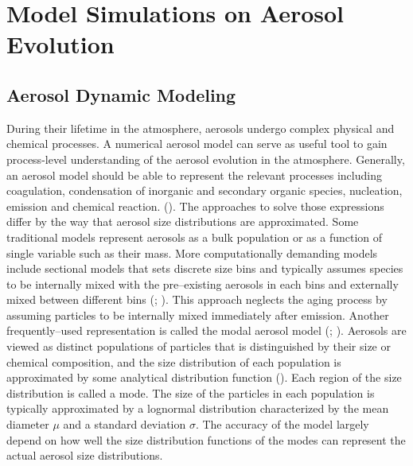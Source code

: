 \documentclass[12pt, fullpage]{uiucthesis2009}
\begin{document}
\newpage

	\section{Model Simulations on Aerosol Evolution}
		\subsection{Aerosol Dynamic Modeling}
		During their lifetime in the atmosphere, aerosols undergo complex physical and chemical processes. A numerical aerosol model can serve as useful tool to gain process-level understanding of the aerosol evolution in the atmosphere. Generally, an aerosol model should be able to represent the relevant processes including coagulation, condensation of inorganic and secondary organic species, nucleation, emission and chemical reaction. (\cite{whitby1997}). The approaches to solve those expressions differ by the way that aerosol size distributions are approximated. Some traditional models represent aerosols as a bulk population or as a function of single variable such as their mass. More computationally demanding models include sectional models that sets discrete size bins and typically assumes species to be internally mixed with the pre--existing aerosols in each bins and externally mixed between different bins (\cite{jacobson2001strong}; \cite{adams1999global}). This approach neglects the aging process by assuming particles to be internally mixed immediately after emission. Another frequently--used representation is called the modal aerosol model (\cite{whitby1997}; \cite{Binkowski1995}). Aerosols are viewed as distinct populations of particles that is distinguished by their size or chemical composition, and the size distribution of each population is approximated by some analytical distribution function (\cite{Binkowski1995}). Each region of the size distribution is called a mode. The size of the particles in each population is typically approximated by a lognormal distribution characterized by the mean diameter $\mu$ and a standard deviation $\sigma$. The accuracy of the model largely depend on how well the size distribution functions of the modes can represent the actual aerosol size distributions.  
		
\end{document}
